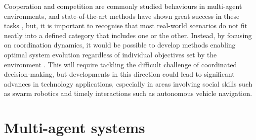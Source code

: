 \documentclass[a4paper,singleside,12pt]{report} %
\begin{document}
Cooperation and competition are commonly studied behaviours in multi-agent environments, and state-of-the-art methods have shown great success in these tasks \cite{Silver2017MasteringCA, Zhang2020MultiAgentCV}, but, it is important to recognise that most real-world scenarios do not fit neatly into a defined category that includes one or the other. Instead, by focusing on coordination dynamics, it would be possible to develop methods enabling optimal system evolution regardless of individual objectives set by the environment \cite{Schrittwieser2019MasteringAG}. This will require tackling the difficult challenge of coordinated decision-making, but developments in this direction could lead to significant advances in technology applications, especially in areas involving social skills such as swarm robotics and timely interactions such as autonomous vehicle navigation.

\section{Multi-agent systems}\label{multi-agent-systems}
\end{document}

